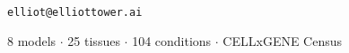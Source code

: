 \documentclass[25pt, a0paper, portrait]{tikzposter}
\begin{document}
\begin{columns}
{  \vspace{8mm}
  \begin{center}
  \texttt{elliot@elliottower.ai}

  \vspace{3mm}
  {\small 8 models $\cdot$ 25 tissues $\cdot$ 104 conditions $\cdot$
  CELLxGENE Census}
  \end{center}
}

\end{columns}
\end{document}
